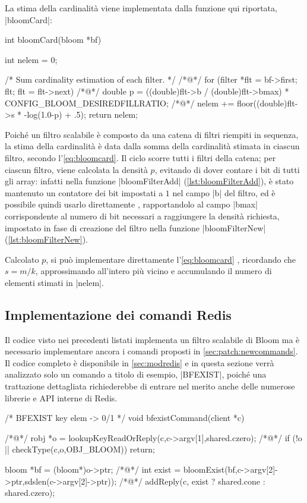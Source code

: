 La stima della cardinalità viene implementata dalla funzione qui riportata, \cverb|bloomCard|:

\begin{commentedsource}[style=csource,caption=Stima della cardinalità]
int bloomCard(bloom *bf) {
    int nelem = 0;

    /* Sum cardinality estimation of each filter. */
/*@\lnote@*/    for (filter *flt = bf->first; flt; flt = flt->next) {
/*@\lnote@*/        double p = ((double)flt->b / (double)flt->bmax) * CONFIG_BLOOM_DESIREDFILLRATIO;
/*@\lnote@*/        nelem += floor((double)flt->s * -log(1.0-p) + .5);
    }
    return nelem;
}
\end{commentedsource}

Poiché un filtro scalabile è composto da una catena di filtri riempiti in sequenza, la stima
della cardinalità è data dalla somma della cardinalità stimata in ciascun filtro, secondo 
l'\autoref{eq:bloomcard}. Il ciclo  scorre tutti i filtri della catena; per ciascun
filtro, viene calcolata la densità $p$, evitando di dover contare i bit di tutti gli array: infatti
nella funzione \cverb|bloomFilterAdd| (\autoref{lst:bloomFilterAdd}), è stato mantenuto un contatore
dei bit impostati a $1$ nel campo \cverb|b| del filtro, ed è possibile quindi usarlo direttamente
, rapportandolo al campo \cverb|bmax| corrispondente al numero di bit necessari a
raggiungere la densità richiesta, impostato in fase di creazione del filtro nella funzione
\cverb|bloomFilterNew| (\autoref{lst:bloomFilterNew}). 

Calcolato $p$, si può implementare direttamente l'\autoref{eq:bloomcard} , ricordando che
$s = m/k$, approssimando all'intero più vicino e accumulando il numero di elementi stimati in
\cverb|nelem|.

\subsection{Implementazione dei comandi Redis}

Il codice visto nei precedenti listati implementa un filtro scalabile di Bloom ma è necessario
implementare ancora i comandi proposti in \autoref{sec:patch:newcommands}. Il codice completo è
disponibile in \autoref{sec:modredis} e in questa sezione verrà analizzato solo un comando a titolo
di esempio, \cverb|BFEXIST|, poiché una trattazione dettagliata richiederebbe di entrare nel merito
anche delle numerose librerie e API interne di Redis.

\begin{commentedsource}[style=csource,caption=Implementazione comando BFEXIST,label={lst:bfexistCommand}]
/* BFEXIST key elem -> 0/1 */
void bfexistCommand(client *c) {
/*@\lnote@*/    robj *o = lookupKeyReadOrReply(c,c->argv[1],shared.czero);
/*@\lnote@*/    if (!o || checkType(c,o,OBJ_BLOOM)) {
        return;
    }

    bloom *bf = (bloom*)o->ptr;
/*@\lnote@*/    int exist = bloomExist(bf,c->argv[2]->ptr,sdslen(c->argv[2]->ptr));
/*@\lnote@*/    addReply(c, exist ? shared.cone : shared.czero);
}
\end{commentedsource}

